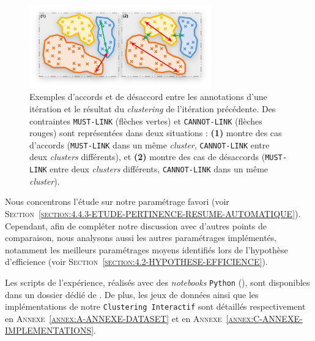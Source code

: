 			\begin{figure}[!htb]
				\centering
				\includegraphics[width=0.70\textwidth]{figures/example-accord-annotation-clustering}
				\caption{
					Exemples d'accords et de désaccord entre les annotations d'une itération et le résultat du \textit{clustering} de l'itération précédente.
					Des contraintes \texttt{MUST-LINK} (flèches vertes) et \texttt{CANNOT-LINK} (flèches rouges) sont représentées dans deux situations : \textbf{(1)} montre des cas d'accords (\texttt{MUST-LINK} dans un même \textit{cluster}, \texttt{CANNOT-LINK} entre deux \textit{clusters} différents), et \textbf{(2)} montre des cas de désaccords (\texttt{MUST-LINK} entre deux \textit{clusters} différents, \texttt{CANNOT-LINK} dans un même \textit{cluster}).
				}
				\label{figure:4.5.1-ETUDE-RENTABILITE-ACCORD-ANNOTATION-CLUSTERING-EXEMPLE}
			\end{figure}
			
			\begin{leftBarIdea}
				Nous concentrons l'étude sur notre paramétrage favori (voir \textsc{Section~\ref{section:4.4.3-ETUDE-PERTINENCE-RESUME-AUTOMATIQUE}}).
				Cependant, afin de compléter notre discussion avec d'autres points de comparaison, nous analysons aussi les autres paramétrages implémentés, notamment les meilleurs paramétrages moyens identifiés lors de l'hypothèse d'efficience (voir \textsc{Section~\ref{section:4.2-HYPOTHESE-EFFICIENCE}}).
			\end{leftBarIdea}
			
			\begin{leftBarInformation}
				Les scripts de l'expérience, réalisés avec des \textit{notebooks} \texttt{Python} (\cite{van-rossum-drake:2009:python-reference-manual}), sont disponibles dans un dossier dédié de \cite{schild:2021:cognitivefactory-interactiveclusteringcomparativestudy}.
				De plus, les jeux de données ainsi que les implémentations de notre \texttt{Clustering Interactif} sont détaillés respectivement en \textsc{Annexe~\ref{annex:A-ANNEXE-DATASET}} et en \textsc{Annexe~\ref{annex:C-ANNEXE-IMPLEMENTATIONS}}.
			\end{leftBarInformation}

